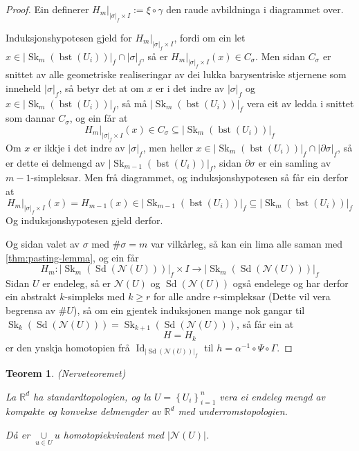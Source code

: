 \documentclass[a4paper, 12pt, norsk]{article}
\theoremstyle{plain}
\newtheorem{theorem}{Teorem}[section]
\theoremstyle{definition}
\newcommand{\Rb}{\mathbb{R}}
\newcommand{\Nc}{\mathcal{N}}
\newcommand{\intersect}{ \mathop{\cap}\limits }
\newcommand{\union}{ \mathop{\cup}\limits }
\newcommand{\gr}[1]{ \lvert #1 \rvert } %
\newcommand{\set}[1]{ \left\{ #1 \right\} } %
\DeclareMathOperator{\Sd}{Sd} %
\DeclareMathOperator{\bst}{bst} %
\DeclareMathOperator{\Sk}{Sk} %
\DeclareMathOperator{\Id}{Id} %
\begin{document}
\begin{proof}
	Ein definerer \( H_m|_{\gr{\sigma}_f \times I} := \xi \circ \gamma \) den raude avbildninga i diagrammet over.

	Induksjonshypotesen gjeld for \( H_m|_{\gr{\sigma}_f \times I} \), fordi om ein let \( x \in \gr{\Sk_m(\bst(U_i))}_f \intersect \gr{\sigma}_f \), så er \( H_m|_{\gr{\sigma}_f \times I}(x) \in C_\sigma \). Men sidan \( C_\sigma \) er snittet av alle geometriske realiseringar av dei lukka barysentriske stjernene som inneheld \( \gr{\sigma}_f \), så betyr det at om \( x \) er i det indre av \( \gr{\sigma}_f \) og \( x \in \gr{\Sk_m(\bst(U_i))}_f \), så må \( \gr{\Sk_m(\bst(U_i))}_f \) vera eit av ledda i snittet som dannar \( C_\sigma \), og ein får at
	\[
		H_m|_{\gr{\sigma}_f \times I}(x) \in C_\sigma \subseteq \gr{\Sk_m(\bst(U_i))}_f
	\]
	Om \( x \) er ikkje i det indre av \( \gr{\sigma}_f \), men heller \( x \in \gr{\Sk_m(\bst(U_i))}_f \intersect \gr{\partial\sigma}_f \), så er dette ei delmengd av \( \gr{\Sk_{m-1}(\bst(U_i))}_f \), sidan \( \partial\sigma \) er ein samling av \( m-1 \)-simpleksar. Men frå diagrammet, og induksjonshypotesen så får ein derfor at
	\[
		H_m|_{\gr{\sigma}_f \times I}(x) = H_{m-1}(x) \in \gr{\Sk_{m-1}(\bst(U_i))}_f \subseteq \gr{\Sk_{m}(\bst(U_i))}_f
	\]
	Og induksjonshypotesen gjeld derfor.

	Og sidan valet av \( \sigma \) med \( \#\sigma = m \) var vilkårleg, så kan ein lima alle saman med \autoref{thm:pasting-lemma}, og ein får
	\[
		H_m : \gr{\Sk_m(\Sd(\Nc(U)))}_f \times I \to \gr{\Sk_m(\Sd(\Nc(U)))}_f
	\]
	Sidan \( U \) er endeleg, så er \( \Nc(U) \) og \( \Sd(\Nc(U)) \) også endelege og har derfor ein abstrakt \( k \)-simpleks med \( k \geq r \) for alle andre \( r \)-simpleksar (Dette vil vera begrensa av \( \#U \)), så om ein gjentek induksjonen mange nok gangar til \( \Sk_{k}(\Sd(\Nc(U))) = \Sk_{k+1}(\Sd(\Nc(U))) \), så får ein at
	\[
		H = H_k
	\]
	er den ynskja homotopien frå \( \Id_{\gr{\Sd(\Nc(U))}_f} \) til \( h = \alpha^{-1} \circ \Psi \circ \Gamma \).

\end{proof}

\begin{theorem}
	(Nerveteoremet)

	La \( \Rb^d \) ha standardtopologien, og la \( U = \set{U_i}_{i=1}^n \) vera ei endeleg mengd av kompakte og konvekse delmengder av \( \Rb^d \) med underromstopologien.
	
	Då er \( \union_{u \in U} u \) homotopiekvivalent med \( \gr{\Nc(U)} \).
\end{theorem}
\end{document}
